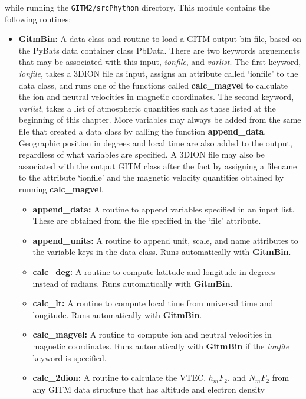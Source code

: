  
\noindent while running the {\tt GITM2/srcPhython} directory.  This module contains the following routines:

\begin{itemize}
\item[]{\bf GitmBin: } A data class and routine to load a GITM output bin file, based on the PyBats data container class PbData.  There are two keywords arguements that may be associated with this input, \textit{ionfile}, and \textit{varlist}.  The first keyword, \textit{ionfile}, takes a 3DION file as input, assigns an attribute called `ionfile' to the data class, and runs one of the functions called {\bf calc\_magvel} to calculate the ion and neutral velocities in magnetic coordinates.  The second keyword, \textit{varlist}, takes a list of atmospheric quantities such as those listed at the beginning of this chapter.  More variables may always be added from the same file that created a data class by calling the function {\bf append\_data}.  Geographic position in degrees and local time are also added to the output, regardless of what variables are specified.  A 3DION file may also be associated with the output GITM class after the fact by assigning a filename to the attribute `ionfile' and the magnetic velocity quantities obtained by running {\bf calc\_magvel}.
	\begin{itemize}
	\item[]{\bf append\_data: } A routine to append variables specified in an input list.  These are obtained from the file specified in the `file' attribute.
	\item[]{\bf append\_units: } A routine to append unit, scale, and name attributes to the variable keys in the data class.  Runs automatically with {\bf GitmBin}.
	\item[]{\bf calc\_deg: } A routine to compute latitude and longitude in degrees instead of radians.  Runs automatically with {\bf GitmBin}.
	\item[]{\bf calc\_lt: } A routine to compute local time from universal time and longitude.  Runs automatically with {\bf GitmBin}.
	\item[]{\bf calc\_magvel: } A routine to compute ion and neutral velocities in magnetic coordinates.  Runs automatically with {\bf GitmBin} if the \textit{ionfile} keyword is specified.
	\item[]{\bf calc\_2dion: } A routine to calculate the VTEC, $h_mF_2$, and $N_mF_2$ from any GITM data structure that has altitude and electron density
	\end{itemize}
\end{itemize}

